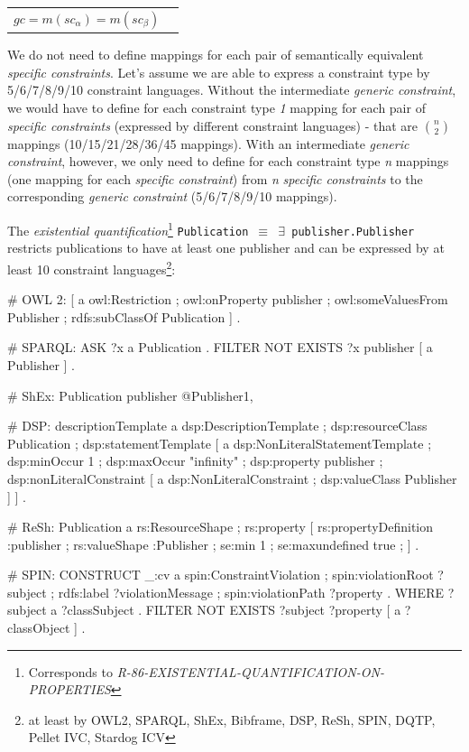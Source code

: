 \documentclass{llncs}
\newcommand{\ms}[1]{\texttt{#1}}
\newenvironment{DL}{
  \vspace{0cm}
	\begin{center}
  \begin{tabular}{r l}

}{
  \end{tabular}
	\end{center}
}
\begin{document}
\begin{DL}
$ gc = m(sc_{\alpha}) = m(sc_{\beta}) $
\end{DL}

We do not need to define mappings for each pair of semantically equivalent \emph{specific constraints}.
Let's assume we are able to express a constraint type by 5/6/7/8/9/10 constraint languages.
Without the intermediate \emph{generic constraint}, we would have to define for each constraint type \emph{1} mapping for each pair of \emph{specific constraints} (expressed by different constraint languages)
- that are \emph{\( {n \choose 2} \)} mappings (10/15/21/28/36/45 mappings).
With an intermediate \emph{generic constraint}, however, we only need to define for each constraint type \emph{n} mappings (one mapping for each \emph{specific constraint}) from \emph{n} \emph{specific constraints} to the corresponding \emph{generic constraint} (5/6/7/8/9/10 mappings).



The {\em existential quantification}\footnote{Corresponds to {\em R-86-EXISTENTIAL-QUANTIFICATION-ON-PROPERTIES}}
\ms{Publication $\equiv$ $\exists$ publisher.Publisher} restricts publications to have at least one publisher and can be expressed by at least 10 constraint languages\footnote{at least by OWL2, SPARQL, ShEx, Bibframe, DSP, ReSh, SPIN, DQTP, Pellet IVC, Stardog ICV}:

\begin{ex}
# OWL 2:
[ a owl:Restriction ;
  owl:onProperty publisher ;
  owl:someValuesFrom Publisher ;
  rdfs:subClassOf Publication ] .
	
# SPARQL:
ASK { ?x a Publication . FILTER NOT EXISTS { ?x publisher [ a Publisher ] } . }
	
# ShEx:
Publication {
    publisher @Publisher{1,} }
		
# DSP:
descriptionTemplate a dsp:DescriptionTemplate ;
    dsp:resourceClass Publication ; 
    dsp:statementTemplate [ a dsp:NonLiteralStatementTemplate ;
        dsp:minOccur 1 ; dsp:maxOccur "infinity" ; 
        dsp:property publisher ; 
        dsp:nonLiteralConstraint [ a dsp:NonLiteralConstraint ;
            dsp:valueClass Publisher ] ] .
		
# ReSh:
Publication a rs:ResourceShape ; rs:property [
    rs:propertyDefinition :publisher ;
    rs:valueShape :Publisher ;
    se:min 1 ; se:maxundefined true ; ] .
		
# SPIN:
CONSTRUCT {
    _:cv a spin:ConstraintViolation ; spin:violationRoot ?subject ;
         rdfs:label ?violationMessage ; spin:violationPath ?property . } WHERE 
{ ?subject a ?classSubject . FILTER NOT EXISTS { ?subject ?property [ a ?classObject ] } . }
\end{ex}
\end{document}
